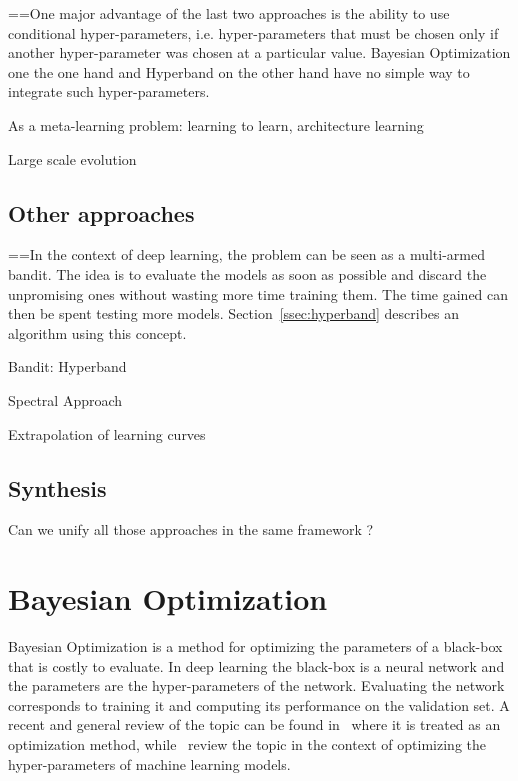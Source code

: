 ==One major advantage of the last two approaches is the ability to use conditional hyper-parameters, i.e. hyper-parameters that must be chosen only if another hyper-parameter was chosen at a particular value. Bayesian Optimization one the one hand and Hyperband on the other hand have no simple way to integrate such hyper-parameters.

As a meta-learning problem: learning to learn, architecture learning

Large scale evolution

\subsection{Other approaches}

==In the context of deep learning, the problem can be seen as a multi-armed bandit. The idea is to evaluate the models as soon as possible and discard the unpromising ones without wasting more time training them. The time gained can then be spent testing more models. Section~\ref{ssec:hyperband} describes an algorithm using this concept.

Bandit: Hyperband~\textcite{li2017ICLR}

Spectral Approach~\textcite{hazan2018ICLR}

Extrapolation of learning curves

\subsection{Synthesis}

Can we unify all those approaches in the same framework ?

\section{Bayesian Optimization}
\label{sec:bo}

Bayesian Optimization is a method for optimizing the parameters of a black-box that is costly to evaluate. In deep learning the black-box is a neural network and the parameters are the hyper-parameters of the network. Evaluating the network corresponds to training it and computing its performance on the validation set. A recent and general review of the topic can be found in~\textcite{shahriari2016IEEE} where it is treated as an optimization method, while~\textcite{snoek2012NIPS} review the topic in the context of optimizing the hyper-parameters of machine learning models.

